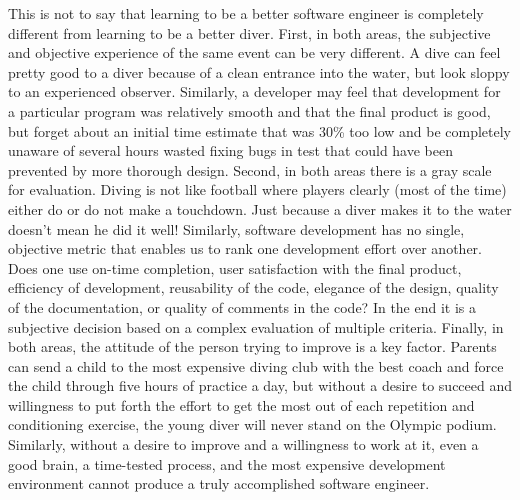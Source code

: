 This is not to say that learning to be a better software engineer is
completely different from learning to be a better diver. First, in both
areas, the subjective and objective experience of the same event can be
very different.  A dive can feel pretty good to a diver because of a clean
entrance into the water, but look sloppy to an experienced observer.
Similarly, a developer may feel that development for a particular program
was relatively smooth and that the final product is good, but forget about
an initial time estimate that was 30\% too low and be completely unaware of
several hours wasted fixing bugs in test that could have been prevented by
more thorough design.  Second, in both areas there is a gray scale for
evaluation.  Diving is not like football where players clearly (most of the
time) either do or do not make a touchdown.  Just because a diver makes it
to the water doesn't mean he did it well!  Similarly, software development
has no single, objective metric that enables us to rank one development
effort over another. Does one use on-time completion, user satisfaction
with the final product, efficiency of development, reusability of the code,
elegance of the design, quality of the documentation, or quality of
comments in the code?  In the end it is a subjective decision based on a
complex evaluation of multiple criteria.  Finally, in both areas, the
attitude of the person trying to improve is a key factor.  Parents can send
a child to the most expensive diving club with the best coach and force the
child through five hours of practice a day, but without a desire to succeed
and willingness to put forth the effort to get the most out of each
repetition and conditioning exercise, the young diver will never stand on
the Olympic podium. Similarly, without a desire to improve and a
willingness to work at it, even a good brain, a time-tested process, and
the most expensive development environment cannot produce a truly
accomplished software engineer.

